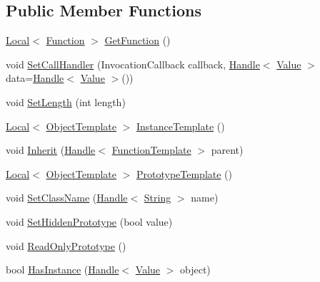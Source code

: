 \subsection*{Public Member Functions}
\begin{DoxyCompactItemize}
\item 
\hyperlink{classv8_1_1_local}{Local}$<$ \hyperlink{classv8_1_1_function}{Function} $>$ \hyperlink{classv8_1_1_function_template_a3b8e5e214b2ee34c36138961ebac696a}{Get\+Function} ()
\item 
void \hyperlink{classv8_1_1_function_template_a9eb1c827b17faf398a81068721bf40ab}{Set\+Call\+Handler} (Invocation\+Callback callback, \hyperlink{classv8_1_1_handle}{Handle}$<$ \hyperlink{classv8_1_1_value}{Value} $>$ data=\hyperlink{classv8_1_1_handle}{Handle}$<$ \hyperlink{classv8_1_1_value}{Value} $>$())
\item 
void \hyperlink{classv8_1_1_function_template_a5faf23b28ee3480b23ce054d0f389a75}{Set\+Length} (int length)
\item 
\hyperlink{classv8_1_1_local}{Local}$<$ \hyperlink{classv8_1_1_object_template}{Object\+Template} $>$ \hyperlink{classv8_1_1_function_template_a00dd9725566908e8fd14064542f5a781}{Instance\+Template} ()
\item 
void \hyperlink{classv8_1_1_function_template_a18f343e7e5749ed886d6e76a1424216e}{Inherit} (\hyperlink{classv8_1_1_handle}{Handle}$<$ \hyperlink{classv8_1_1_function_template}{Function\+Template} $>$ parent)
\item 
\hyperlink{classv8_1_1_local}{Local}$<$ \hyperlink{classv8_1_1_object_template}{Object\+Template} $>$ \hyperlink{classv8_1_1_function_template_aa2bcc2652b5f0fdbc666d943ccf72021}{Prototype\+Template} ()
\item 
void \hyperlink{classv8_1_1_function_template_a10ad6f0d3d1f67823e08fbca7c5dde41}{Set\+Class\+Name} (\hyperlink{classv8_1_1_handle}{Handle}$<$ \hyperlink{classv8_1_1_string}{String} $>$ name)
\item 
void \hyperlink{classv8_1_1_function_template_ade426e8a21d777ae6100e6c1aa7bfaee}{Set\+Hidden\+Prototype} (bool value)
\item 
void \hyperlink{classv8_1_1_function_template_a91d2e0643e8c5a53ab1d75f7766c2422}{Read\+Only\+Prototype} ()
\item 
bool \hyperlink{classv8_1_1_function_template_aa883e4ab6643498662f7873506098c98}{Has\+Instance} (\hyperlink{classv8_1_1_handle}{Handle}$<$ \hyperlink{classv8_1_1_value}{Value} $>$ object)
\end{DoxyCompactItemize}
